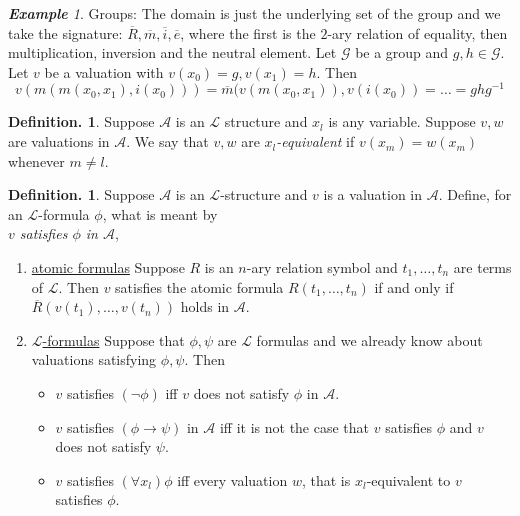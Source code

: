 \documentclass[a4paper,oneside,11pt,DIV=12,parskip=half]{scrartcl}
\newcommand{\LL}{\mathcal L}
\theoremstyle{plain}
\theoremstyle{definition}
\newtheorem{definition}[theorem]{Definition.}
\newtheorem{remark, definition}[theorem]{Remark and Definition.}
\newtheorem{lemma, definition}[theorem]{Lemma and Definition.}
\newtheorem{theorem, definition}[theorem]{Theorem and Definition.}
\theoremstyle{remark}
\newtheorem*{example}{\textbf{Example}}
\newtheorem*{remark, example}{\textbf{Remark and Exercise}}
\begin{document}
\begin{example}
Groups:  The domain is just the underlying set of the group and we take the signature: $\overline{R},\overline{m},\overline{i},\overline{e}$, where the first is the $2$-ary relation of equality, then multiplication, inversion and the neutral element.
Let $\mathcal{G}$ be a group and $g,h \in \mathcal{G}$. Let $v$ be a valuation with $ v(x_0) = g, v(x_1)=h$. Then 
\[ v(m(m(x_0,x_1),i(x_0))) = \overline{m}(v(m(x_0,x_1)),v(i(x_0)) = \dots = ghg^{-1} \]
\end{example}

\begin{definition}
 Suppose $\mathcal{A}$ is an $\LL$ structure and $x_l$ is any variable. Suppose $v,w$ are valuations in $\mathcal{A}$. We say that $v,w$ are \emph{$x_l$-equivalent} if $v(x_m) = w(x_m)$ whenever $m \neq l$.
\end{definition}

\begin{definition}
 Suppose $\mathcal{A}$ is an $\LL$-structure and $v$ is a valuation in $\mathcal{A}$.
 Define, for an $\LL$-formula $\phi$, what is meant by \\
\emph{$v$ satisfies $\phi$ in $\mathcal{A}$},
\begin{enumerate}
    \item \underline{atomic formulas}
    Suppose $R$ is an $n$-ary relation symbol and $t_1,\dots,t_n$ are terms of $\LL$. Then $v$ satisfies the atomic formula $R(t_1,\dots,t_n)$ if and only if $\overline{R}(v(t_1),\dots,v(t_n))$ holds in $\mathcal{A}$.
    \item \underline{$\LL$-formulas}
    Suppose that $\phi,\psi$ are $\LL$ formulas and we already know about valuations satisfying $\phi,\psi$. Then
    \begin{itemize}
        \item $v$ satisfies $(\lnot \phi) $ iff $v$ does not satisfy $\phi$ in $\mathcal{A}$.
        \item $v$ satisfies $(\phi \rightarrow \psi)$ in $\mathcal{A}$ iff it is not the case that $v$ satisfies $\phi$ and $v$ does not satisfy $\psi$.
        \item $v$ satisfies $(\forall x_l ) \phi $ iff every valuation $w$, that is $x_l$-equivalent to $v$ satisfies $\phi$.
    \end{itemize}
\end{enumerate}
\end{definition}
\end{document}
